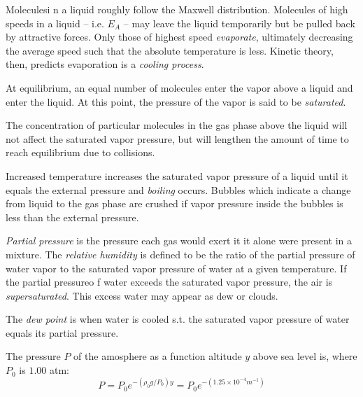 \begin{remark}
    Moleculesi n a liquid roughly follow the Maxwell distribution. Molecules of high speeds in a liquid – i.e. $E_A$ – may leave the liquid temporarily but be pulled back by attractive forces. Only those of highest speed \emph{evaporate}, ultimately decreasing the average speed such that the absolute temperature is less. Kinetic theory, then, predicts evaporation is a \emph{cooling process}.
\end{remark}
\begin{definition}
    At equilibrium, an equal number of molecules enter the vapor above a liquid and enter the liquid. At this point, the pressure of the vapor is said to be \emph{saturated}.
\end{definition}
\begin{remark}
    The concentration of particular molecules in the gas phase above the liquid will not affect the saturated vapor pressure, but will lengthen the amount of time to reach equilibrium due to collisions.
\end{remark}
\begin{remark}
    Increased temperature increases the saturated vapor pressure of a liquid until it equals the external pressure and \emph{boiling} occurs. Bubbles which indicate a change from liquid to the gas phase are crushed if vapor pressure inside the bubbles is less than the external pressure.
\end{remark}
\begin{definition}
    \emph{Partial pressure} is the pressure each gas would exert it it alone were present in a mixture. The \emph{relative humidity} is defined to be the ratio of the partial pressure of water vapor to the saturated vapor pressure of water at a given temperature. If the partial pressureo f water exceeds the saturated vapor pressure, the air is \emph{supersaturated}. This excess water may appear as dew or clouds.
\end{definition}
\begin{definition}
    The \emph{dew point} is when water is cooled s.t. the saturated vapor pressure of water equals its partial pressure.
\end{definition}
\begin{note}
    The pressure $P$ of the amosphere as a function altitude $y$ above sea level is, where $P_0$ is $1.00$ atm: 
    $$P = P_0 e^{-(\rho_0g/P_0)y} = P_0e^{-(1.25\times10^{-4}m^{-1})}$$ 
\end{note}

